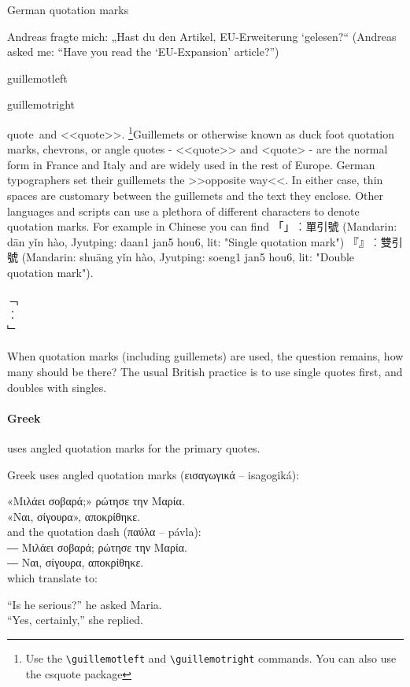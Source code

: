 \begin{scriptexample}[]{German quotation marks}

Andreas fragte mich: „Hast du den Artikel‚ EU-Erweiterung ‘gelesen?“ (Andreas asked me: \enquote{Have you read the \enquote{EU-Expansion} article?})
\end{scriptexample}

\begin{docCommand}{guillemotleft}{}
\end{docCommand}

\begin{docCommand}{guillemotright}{}
\end{docCommand}

\guillemotleft quote\guillemotright\ and <<quote>>. \footnote{Use the \texttt{\textbackslash{guillemotleft}} and \texttt{\textbackslash{guillemotright}} commands. You can also use the \protect{} csquote package}Guillemets or otherwise known as duck foot quotation marks, chevrons, or angle quotes - <<quote>> and <quote> - are the normal form in France and Italy and are widely used in the rest of Europe. German typographers set their guillemets the 
>>opposite way<<. In either case, thin spaces are customary between the guillemets and the text they enclose. Other languages and scripts can use a plethora of different characters to denote quotation marks. For example in Chinese you can find {\panunicode 「」︰單引號 (Mandarin: dān yǐn hào, Jyutping: daan1 jan5 hou6, lit: "Single quotation mark")
『』︰雙引號 (Mandarin: shuāng yǐn hào, Jyutping: soeng1 jan5 hou6, lit: "Double quotation mark"}). 

\bgroup
\LARGE
\noindent\panunicode
﹁\\
︰\\
﹂\\
\egroup

When quotation marks (including guillemets) are used, the question remains, how many should be there?
The usual British practice is to use single quotes first, and doubles with singles.




\paragraph{Greek} uses angled quotation marks for the primary quotes.


\begin{scriptexample}[\panunicode]{}
Greek uses angled quotation marks (εισαγωγικά – isagogiká):

«Μιλάει σοβαρά;» ρώτησε την Μαρία.\\
«Ναι, σίγουρα», αποκρίθηκε.\\
and the quotation dash (παύλα – pávla):\\

― Μιλάει σοβαρά; ρώτησε την Μαρία.\\
― Ναι, σίγουρα, αποκρίθηκε.\\
which translate to:

“Is he serious?” he asked Maria.\\
“Yes, certainly,” she replied.
\end{scriptexample}

